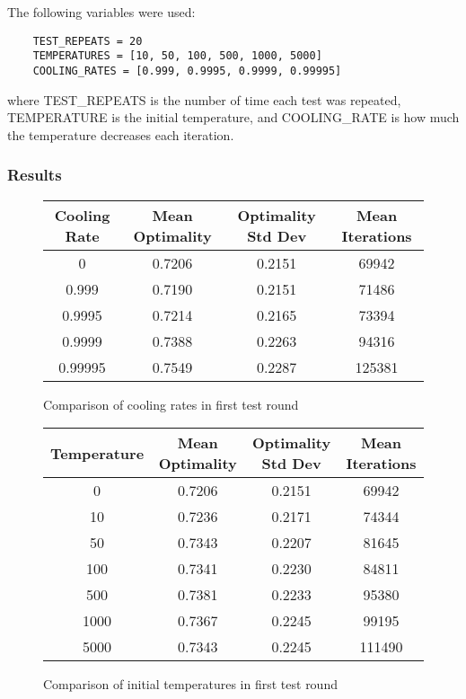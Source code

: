 \documentclass{article}
\begin{document}
The following variables were used:

\begin{verbatim}
    TEST_REPEATS = 20
    TEMPERATURES = [10, 50, 100, 500, 1000, 5000]
    COOLING_RATES = [0.999, 0.9995, 0.9999, 0.99995]
\end{verbatim}

where TEST\_REPEATS is the number of time each test was repeated, TEMPERATURE is the initial temperature, and COOLING\_RATE is how much the temperature decreases each iteration.

\subsubsection{Results}

\begin{figure}[h]
    \centering
    \begin{tabular}{ |c|c|c|c| } 
        \hline
        Cooling Rate & Mean Optimality & Optimality Std Dev & Mean Iterations \\ 
        \hline
        0       & 0.7206 & 0.2151 & 69942 \\
        \hline
        0.999   & 0.7190 & 0.2151 & 71486 \\
        \hline
        0.9995  & 0.7214 & 0.2165 & 73394 \\ 
        \hline
        0.9999  & 0.7388 & 0.2263 & 94316 \\
        \hline
        0.99995 & 0.7549 & 0.2287 & 125381 \\
        \hline
    \end{tabular}
    \caption{Comparison of cooling rates in first test round}
\end{figure}


\begin{figure}[h]
    \centering
    \begin{tabular}{ |c|c|c|c| } 
        \hline
        Temperature & Mean Optimality & Optimality Std Dev & Mean Iterations \\ 
        \hline
        0    & 0.7206 & 0.2151 & 69942 \\
        \hline
        10   & 0.7236 & 0.2171 & 74344 \\
        \hline
        50   & 0.7343 & 0.2207 & 81645 \\
        \hline
        100  & 0.7341 & 0.2230 & 84811 \\ 
        \hline
        500  & 0.7381 & 0.2233 & 95380 \\
        \hline
        1000 & 0.7367 & 0.2245 & 99195 \\
        \hline
        5000 & 0.7343 & 0.2245 & 111490 \\
        \hline
    \end{tabular}
    \caption{Comparison of initial temperatures in first test round}
\end{figure}
\end{document}
